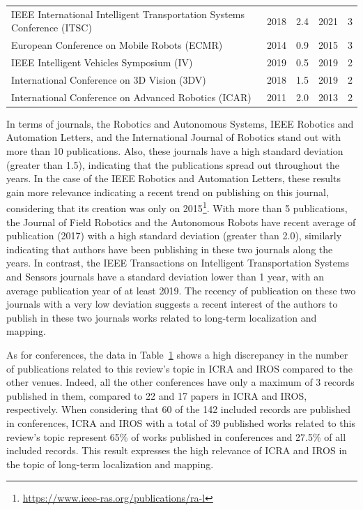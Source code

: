 \begin{table}[!h]
{\begin{tabular}{p{}cccc}
IEEE International Intelligent Transportation Systems Conference (ITSC) & 2018 & 2.4 & 2021 & 3\\
European Conference on Mobile Robots (ECMR) & 2014 & 0.9 & 2015 & 3\\
IEEE Intelligent Vehicles Symposium (IV) & 2019 & 0.5 & 2019 & 2\\
International Conference on 3D Vision (3DV) & 2018 & 1.5 & 2019 & 2\\
International Conference on Advanced Robotics (ICAR) & 2011 & 2.0 & 2013 & 2\\
\hline
  \end{tabular}\label{tab:overview:publication:conference}%
  }
\end{table}

In terms of journals, the Robotics and Autonomous Systems, IEEE Robotics and Automation Letters, and the International Journal of Robotics stand out with more than 10 publications. Also, these journals have a high standard deviation (greater than 1.5), indicating that the publications spread out throughout the years.
In the case of the IEEE Robotics and Automation Letters, these results gain more relevance indicating a recent trend on publishing on this journal, considering that its creation was only on 2015\footnote{\url{https://www.ieee-ras.org/publications/ra-l}}.
With more than 5 publications, the Journal of Field Robotics and the Autonomous Robots have recent average of publication (2017) with a high standard deviation (greater than 2.0), similarly indicating that authors have been publishing in these two journals along the years.
In contrast, the IEEE Transactions on Intelligent Transportation Systems and Sensors journals have a standard deviation lower than 1 year, with an average publication year of at least 2019. The recency of publication on these two journals with a very low deviation suggests a recent interest of the authors to publish in these two journals works related to long-term localization and mapping.

As for conferences, the data in Table~\ref{tab:overview:publication:conference} shows a high discrepancy in the number of publications related to this review's topic in ICRA and IROS compared to the other venues. Indeed, all the other conferences have only a maximum of 3 records published in them, compared to 22 and 17 papers in ICRA and IROS, respectively. When considering that 60 of the 142 included records are published in conferences, ICRA and IROS with a total of 39 published works related to this review's topic represent 65\% of works published in conferences and 27.5\% of all included records. This result expresses the high relevance of ICRA and IROS in the topic of long-term localization and mapping.

